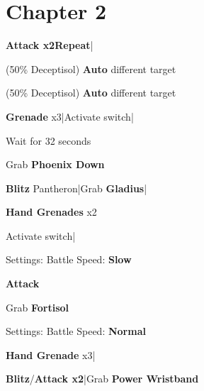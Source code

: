 \section{Chapter 2}

\begin{mainlist}
	\item {}
	\item {} \textbf{Attack x2}\to\textbf{Repeat}|\skip
	\item {} (50\% Deceptisol) \textbf{Auto} different target
	\item {} (50\% Deceptisol) \textbf{Auto} different target
	\item {}
	\item {} \textbf{Grenade} x3|Activate switch|
	\item {} Wait for 32 seconds
	\item Grab \textbf{Phoenix Down}
	\item {} \textbf{Blitz} Pantheron|Grab \textbf{Gladius}|
	\item {} \textbf{Hand Grenades} x2
	\item Activate switch|\skip
\end{mainlist}

\begin{menu}
	\item Settings: Battle Speed: \textbf{Slow}
\end{menu}

\begin{mainlist}
	\item {}
	\item {} \textbf{Attack}
	\item Grab \textbf{Fortisol}
\end{mainlist}

\begin{menu}
	\item Settings: Battle Speed: \textbf{Normal}
\end{menu}

\begin{mainlist}
	\item \skip
	\item {} \textbf{Hand Grenade} x3|
	\item {} \textbf{Blitz}/\textbf{Attack x2}|Grab \textbf{Power Wristband}
\end{mainlist}

